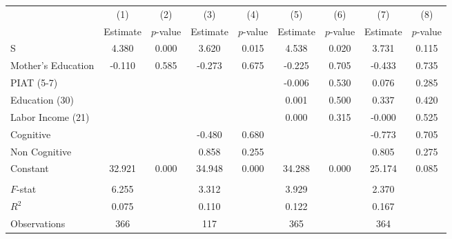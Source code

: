 \begin{tabular}{lcccccccc} \toprule
 & (1) & (2) & (3) & (4) & (5) & (6) & (7) & (8) \\ 
 & Estimate  & $p$-value  & Estimate  & $p$-value  & Estimate  & $p$-value  & Estimate  & $p$-value  \\  \midrule
S &     4.380 &     0.000 &     3.620 &     0.015 &     4.538 &     0.020 &     3.731 &     0.115 \\  
Mother's Education &    -0.110 &     0.585 &    -0.273 &     0.675 &    -0.225 &     0.705 &    -0.433 &     0.735 \\  
PIAT (5-7) &         &         &         &         &    -0.006 &     0.530 &     0.076 &     0.285 \\  
Education (30) &         &         &         &         &     0.001 &     0.500 &     0.337 &     0.420 \\  
Labor Income (21) &         &         &         &         &     0.000 &     0.315 &    -0.000 &     0.525 \\  
Cognitive &         &         &    -0.480 &     0.680 &         &         &    -0.773 &     0.705 \\  
Non Cognitive &         &         &     0.858 &     0.255 &         &         &     0.805 &     0.275 \\  
Constant &    32.921 &     0.000 &    34.948 &     0.000 &    34.288 &     0.000 &    25.174 &     0.085 \\  \\ \midrule
$F$-stat &     6.255 &         &     3.312 &         &     3.929 &         &     2.370 &         \\  
$R^2$ &     0.075 &         &     0.110 &         &     0.122 &         &     0.167 &         \\  
Observations &   366 &         &   117 &         &   365 &         &   364 &         \\  
\bottomrule \end{tabular}
